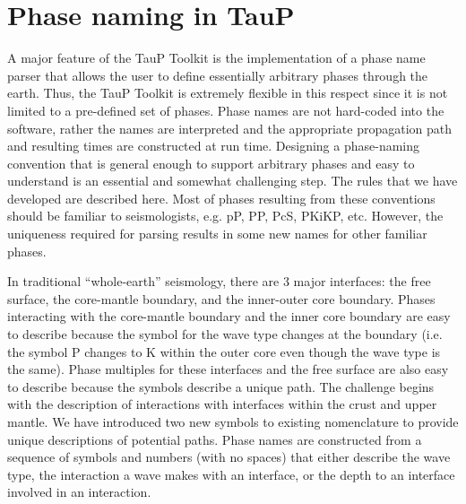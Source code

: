 

\section{Phase naming in TauP} \label{phasenaming}


A major feature of the TauP Toolkit is the implementation of a phase name parser
that allows the user to define essentially arbitrary phases through the earth.
Thus, the TauP Toolkit is extremely flexible in this respect since it is
not limited to a pre-defined set of phases.
Phase names are not hard-coded into the software, rather the names are interpreted
and the appropriate propagation path and resulting times are constructed at run time.
Designing a phase-naming convention that is general enough to support arbitrary phases
and easy to understand is an essential and somewhat challenging step.
The rules that we have developed are described here.
Most of phases resulting from these conventions should
be familiar to seismologists, e.g. pP, PP, PcS, PKiKP, etc.
However, the uniqueness required for parsing results in some new names for other
familiar phases.

In traditional ``whole-earth'' seismology, there are 3 major interfaces:  the free
surface, the core-mantle boundary, and the inner-outer core boundary.
Phases interacting with the core-mantle boundary and the inner core boundary are easy to
describe because the symbol for the wave type changes at the boundary (i.e. the symbol P
changes to K within the outer core even though the wave type is the same).
Phase multiples for these interfaces and the free surface are also easy to describe because
the symbols describe a unique path.
The challenge begins with the description of interactions with interfaces within the
crust and upper mantle.
We have introduced two new symbols to existing
nomenclature to provide unique descriptions of potential paths.
Phase names are constructed from a sequence of symbols and numbers (with no spaces)
that either describe the wave type, the interaction a wave makes with an interface, or
the depth to an interface involved in an interaction.

